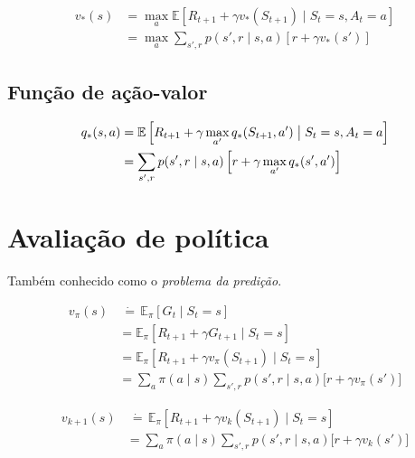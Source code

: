 \documentclass{article}
\begin{document}
        \begin{equation}
            \begin{split}
                v_*(s) & = \max_a \mathbb{E} \left[ R_{t+1} + \gamma v_*(S_{t+1}) \mid S_t = s, A_t = a \right] \\
                & = \max_a \sum_{s', r} p(s',r \mid s,a) \left[ r + \gamma v_*(s') \right]
            \end{split}
        \end{equation}
    
    \subsection{Função de ação-valor}

        \begin{equation}
            \begin{split}
                q_*(s,a) & = \mathbb{E} \left[ R_{t+1} + \gamma \max_{a'} q_*(S_{t+1}, a') \bigm\vert S_t = s, A_t = a \right] \\
                & = \sum_{s', r} p(s',r \mid s,a) \left[ r + \gamma \max_{a'}q_*(s', a') \right]
            \end{split}
        \end{equation}
        
\section{Avaliação de política}

    Também conhecido como o \textit{problema da predição}.
    
    \begin{equation}
        \begin{split}
            v_{\pi}(s) & \ \dot{=} \, \mathbb{E}_{\pi} \left[ G_t \mid S_t = s \right] \\
            & = \mathbb{E}_{\pi} \left[ R_{t+1} + \gamma G_{t+1} \mid S_t = s \right] \\
            & = \mathbb{E}_{\pi} \left[ R_{t+1} + \gamma v_{\pi}(S_{t+1}) \mid S_t = s \right] \\
            & = \sum_a \pi(a \mid s) \sum_{s',r} p(s',r \mid s,a) \Big[ r + \gamma v_{\pi}(s') \Big]
        \end{split}
    \end{equation}
    
    \begin{equation}
        \begin{split}
            v_{k+1}(s) & \ \dot{=} \, \mathbb{E}_{\pi} \left[ R_{t+1} + \gamma v_k(S_{t+1}) \mid S_t = s \right] \\
            & = \sum_a \pi(a \mid s) \sum_{s',r} p(s',r \mid s,a) \Big[ r + \gamma v_k(s') \Big]
        \end{split}
    \end{equation}
    
\end{document}
